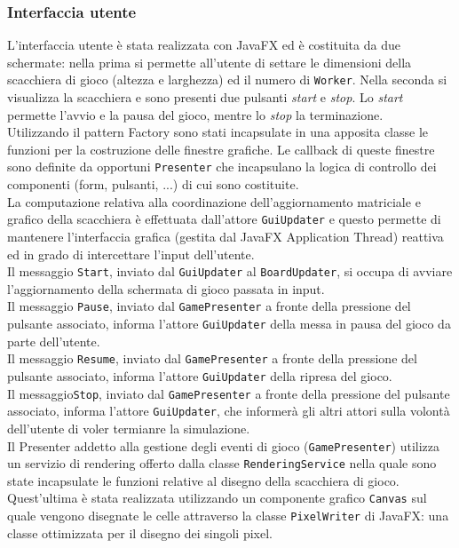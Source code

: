 \documentclass[a4paper]{article}
\begin{document}
\subsubsection{Interfaccia utente}\label{interfaccia-utente}

L’interfaccia utente è stata realizzata con JavaFX ed è costituita da due schermate: nella prima si permette all’utente di settare le dimensioni della scacchiera di gioco (altezza e larghezza) ed il numero di \texttt{Worker}. Nella seconda si visualizza la scacchiera e sono presenti due pulsanti \textit{start} e \textit{stop}. Lo \textit{start} permette l’avvio e la pausa del gioco, mentre lo \textit{stop} la terminazione.\\
Utilizzando il pattern Factory sono stati incapsulate in una apposita classe le funzioni per la costruzione delle finestre grafiche. Le callback di queste finestre sono definite da opportuni \texttt{Presenter} che incapsulano la logica di controllo dei componenti (form, pulsanti, ...) di cui sono costituite.\\
La computazione relativa alla coordinazione dell’aggiornamento matriciale e grafico della scacchiera è effettuata dall'attore \texttt{GuiUpdater} e questo permette di mantenere l’interfaccia grafica (gestita dal JavaFX Application Thread) reattiva ed in grado di intercettare l’input dell’utente.\\
Il messaggio \texttt{Start}, inviato dal \texttt{GuiUpdater} al \texttt{BoardUpdater}, si occupa di avviare l'aggiornamento della schermata di gioco passata in input.\\
Il messaggio \texttt{Pause}, inviato dal \texttt{GamePresenter} a fronte della pressione del pulsante associato, informa l'attore \texttt{GuiUpdater} della messa in pausa del gioco da parte dell'utente.\\
Il messaggio \texttt{Resume}, inviato dal \texttt{GamePresenter} a fronte della pressione del pulsante associato, informa l'attore \texttt{GuiUpdater} della ripresa del gioco.\\
Il messaggio\texttt{Stop}, inviato dal \texttt{GamePresenter} a fronte della pressione del pulsante associato, informa l'attore \texttt{GuiUpdater}, che informerà gli altri attori sulla volontà dell'utente di voler termianre la simulazione.\\
Il Presenter addetto alla gestione degli eventi di gioco (\texttt{GamePresenter}) utilizza un servizio di rendering offerto dalla classe \texttt{RenderingService} nella quale sono state incapsulate le funzioni relative al disegno della scacchiera di gioco.\\
Quest'ultima è stata realizzata utilizzando un componente grafico \texttt{Canvas} sul quale vengono disegnate le celle attraverso la classe \texttt{PixelWriter} di JavaFX: una classe ottimizzata per il disegno dei singoli pixel.
\end{document}
